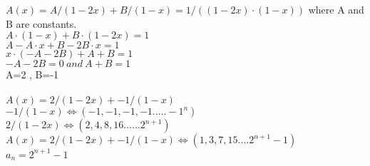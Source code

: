 \documentclass[12pt]{article}
\begin{document}
$A(x)=A/(1-2x)+B/(1-x)=1/((1-2x) \cdot (1-x))$
where A and B are constants.\\
$A \cdot (1-x) + B \cdot (1-2x)=1$\\
$A-A \cdot x + B-2B \cdot x=1$\\
$x \cdot (-A-2B)+A+B=1$\\
$-A-2B=0 \ and \ A+B=1$\\
A=2 , B=-1\\\\
$A(x)=2/(1-2x)+ -1/(1-x)$\\
$-1/(1-x) \iff (-1,-1,-1,-1.....-1^n)$\\
$2/(1-2x) \iff (2,4,8,16......2^{n+1})$\\
$A(x)=2/(1-2x)+ -1/(1-x) \iff (1,3,7,15....2^{n+1}-1)$\\
$a_n=2^{n+1}-1$\\
\end{document}
